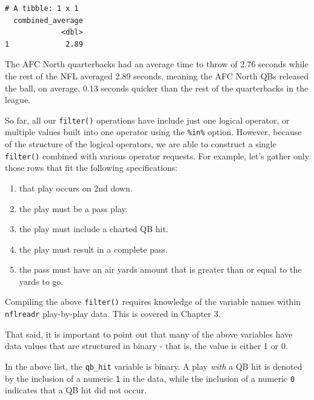 \documentclass[
  letterpaper,
]{krantz}
\providecommand{\tightlist}{%
  \setlength{\itemsep}{0pt}\setlength{\parskip}{0pt}}\usepackage{longtable,booktabs,array}
\begin{document}
\begin{verbatim}
# A tibble: 1 x 1
  combined_average
             <dbl>
1             2.89
\end{verbatim}

The AFC North quarterbacks had an average time to throw of 2.76 seconds
while the rest of the NFL averaged 2.89 seconds, meaning the AFC North
QBs released the ball, on average, 0.13 seconds quicker than the rest of
the quarterbacks in the league.

So far, all our \texttt{filter()} operations have include just one
logical operator, or multiple values built into one operator using the
\texttt{\%in\%} option. However, because of the structure of the logical
operators, we are able to construct a single \texttt{filter()} combined
with various operator requests. For example, let's gather only those
rows that fit the following specifications:

\begin{enumerate}
\def\labelenumi{\arabic{enumi}.}
\tightlist
\item
  that play occurs on 2nd down.
\item
  the play must be a pass play.
\item
  the play must include a charted QB hit.
\item
  the play must result in a complete pass.
\item
  the pass must have an air yards amount that is greater than or equal
  to the yards to go.
\end{enumerate}

\begin{tcolorbox}[enhanced jigsaw, left=2mm, toprule=.15mm, opacitybacktitle=0.6, leftrule=.75mm, bottomrule=.15mm, colbacktitle=quarto-callout-tip-color!10!white, breakable, colback=white, bottomtitle=1mm, toptitle=1mm, title=\textcolor{quarto-callout-tip-color}{\faLightbulb}\hspace{0.5em}{Tip}, coltitle=black, titlerule=0mm, arc=.35mm, opacityback=0, colframe=quarto-callout-tip-color-frame, rightrule=.15mm]

Compiling the above \texttt{filter()} requires knowledge of the variable
names within \texttt{nflreadr} play-by-play data. This is covered in
Chapter 3.

That said, it is important to point out that many of the above variables
have data values that are structured in binary - that is, the value is
either 1 or 0.

In the above list, the \texttt{qb\_hit} variable is binary. A play
\emph{with} a QB hit is denoted by the inclusion of a numeric \texttt{1}
in the data, while the inclusion of a numeric \texttt{0} indicates that
a QB hit did not occur.

\end{tcolorbox}
\end{document}

